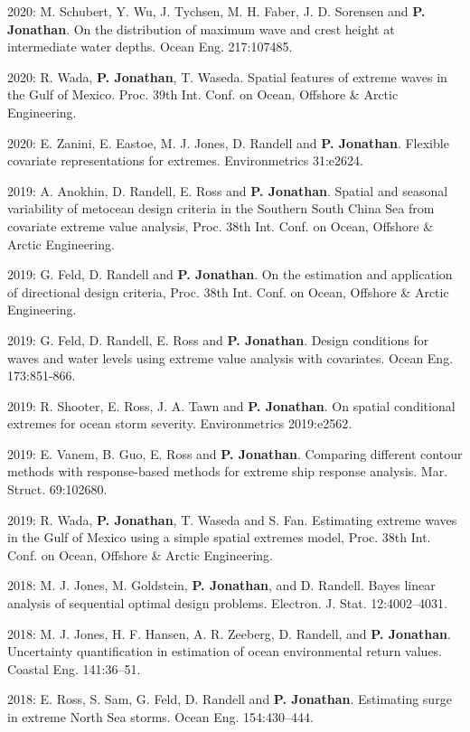 \documentclass[11pt,a4paper]{moderncv}
\begin{document}
2020: M. Schubert, Y. Wu,  J. Tychsen, M. H. Faber, J. D. Sorensen and \textbf{P. Jonathan}. On the distribution of maximum wave and crest height at intermediate water depths. Ocean Eng. 217:107485.

2020: R. Wada, \textbf{P. Jonathan}, T. Waseda. Spatial features of extreme waves in the Gulf of Mexico. Proc. 39th Int. Conf. on Ocean, Offshore \& Arctic Engineering.

2020: E. Zanini, E. Eastoe, M. J. Jones, D. Randell and \textbf{P. Jonathan}. Flexible covariate representations for extremes. Environmetrics 31:e2624.

2019: A. Anokhin, D. Randell, E. Ross and \textbf{P. Jonathan}. Spatial and seasonal variability of metocean design criteria in the Southern South China Sea from covariate extreme value analysis, Proc. 38th Int. Conf. on Ocean, Offshore \& Arctic Engineering.

2019: G. Feld, D. Randell and \textbf{P. Jonathan}. On the estimation and application of directional design criteria, Proc. 38th Int. Conf. on Ocean, Offshore \& Arctic Engineering. 

2019: G. Feld, D. Randell, E. Ross and \textbf{P. Jonathan}. Design conditions for waves and water levels using extreme value analysis with covariates. Ocean Eng. 173:851-866.

2019: R. Shooter, E. Ross, J. A. Tawn and \textbf{P. Jonathan}. On spatial conditional extremes for ocean storm severity. Environmetrics 2019:e2562.

2019: E. Vanem, B. Guo, E. Ross and \textbf{P. Jonathan}. Comparing different contour methods with response-based methods for extreme ship response analysis. Mar. Struct. 69:102680.

2019: R. Wada, \textbf{P. Jonathan}, T. Waseda and S. Fan. Estimating extreme waves in the Gulf of Mexico using a simple spatial extremes model, Proc. 38th Int. Conf. on Ocean, Offshore \& Arctic Engineering.

2018: M. J. Jones, M. Goldstein, \textbf{P. Jonathan}, and D. Randell. Bayes linear analysis of sequential optimal design problems. Electron. J. Stat. 12:4002--4031.

2018: M. J. Jones, H. F. Hansen, A. R. Zeeberg, D. Randell, and \textbf{P. Jonathan}. Uncertainty quantification in estimation of ocean environmental return values. Coastal Eng. 141:36--51.

2018: E. Ross, S. Sam, G. Feld, D. Randell and \textbf{P. Jonathan}. Estimating surge in extreme North Sea storms. Ocean Eng. 154:430--444.
\end{document}
